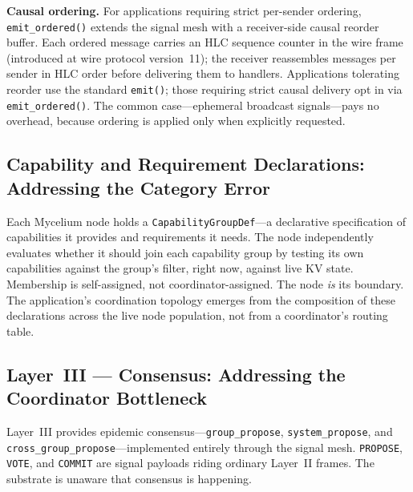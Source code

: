 \documentclass[11pt]{article}
\begin{document}
\textbf{Causal ordering.} For applications requiring strict per-sender ordering,
\texttt{emit\_ordered()} extends the signal mesh with a receiver-side causal
reorder buffer. Each ordered message carries an HLC sequence counter in the wire
frame (introduced at wire protocol version~11); the receiver reassembles messages
per sender in HLC order before delivering them to handlers. Applications tolerating
reorder use the standard \texttt{emit()}; those requiring strict causal delivery
opt in via \texttt{emit\_ordered()}. The common case---ephemeral broadcast
signals---pays no overhead, because ordering is applied only when explicitly requested.

\subsection{Capability and Requirement Declarations: Addressing the Category Error}

Each Mycelium node holds a \texttt{CapabilityGroupDef}---a declarative
specification of capabilities it provides and requirements it needs. The node
independently evaluates whether it should join each capability group by testing its
own capabilities against the group's filter, right now, against live KV state.
Membership is self-assigned, not coordinator-assigned. The node \emph{is} its
boundary. The application's coordination topology emerges from the composition of
these declarations across the live node population, not from a coordinator's
routing table.

\subsection{Layer~III --- Consensus: Addressing the Coordinator Bottleneck}

Layer~III provides epidemic consensus---\texttt{group\_propose},
\texttt{system\_propose}, and \texttt{cross\_group\_propose}---implemented entirely
through the signal mesh. \texttt{PROPOSE}, \texttt{VOTE}, and \texttt{COMMIT} are
signal payloads riding ordinary Layer~II frames. The substrate is unaware that
consensus is happening.
\end{document}
